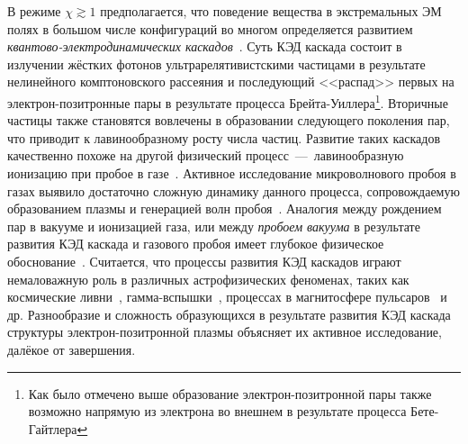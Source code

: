 В режиме $\chi\gtrsim 1$ предполагается, что поведение вещества в экстремальных ЭМ полях в большом числе конфигураций во многом определяется развитием \textit{квантово-электродинамических каскадов}~\cite{nerush2007radiation,Bell2008,Nerush11a,Ridgers12,narozhny2015quantum,Kostyukov2016,grismayer2017seeded,jirka2017qed,luo2018qed,Yuan2018,del2018ion,Lu2018,Luo2018,efimenko2019laser}.
Суть КЭД каскада состоит в излучении жёстких фотонов ультрарелятивистскими частицами в результате нелинейного комптоновского рассеяния и последующий <<распад>> первых на электрон-позитронные пары в результате процесса Брейта-Уиллера\footnote{ Как было отмечено выше образование электрон-позитронной пары также возможно напрямую из электрона во внешнем в результате процесса Бете-Гайтлера}. 
Вторичные частицы также становятся вовлечены в образовании следующего поколения пар, что приводит к лавинообразному росту числа частиц.
Развитие таких каскадов качественно похоже на другой физический процесс~---~лавинообразную ионизацию при пробое в газе~\cite{raizer1997gas}.
Активное исследование микроволнового пробоя в газах выявило достаточно сложную динамику данного процесса, сопровождаемую образованием плазмы и генерацией волн пробоя~\cite{bollen1983high,semenov1982breakdown}.
Аналогия между рождением пар в вакууме и ионизацией газа, или между \textit{пробоем вакуума} в результате развития КЭД каскада и газового пробоя имеет глубокое физическое обоснование~\cite{dunne2012,narozhny2015quantum,efimenko2018extreme}.
Считается, что процессы развития КЭД каскадов играют немаловажную роль в различных астрофизических феноменах, таких как космические ливни~\cite{bhabha1937passage}, гамма-вспышки~\cite{meszaros2006gamma}, процессах в магнитосфере пульсаров~\cite{sturrock1971model,ruderman1975theory,daugherty1982electromagnetic, philippov2015ab} и др. 
Разнообразие и сложность образующихся в результате развития КЭД каскада структуры электрон-позитронной плазмы объясняет их активное исследование, далёкое от завершения.

